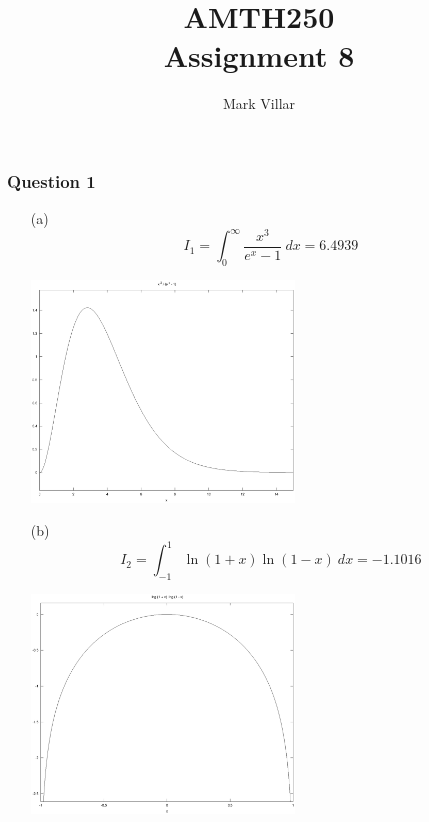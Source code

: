 \documentclass[11pt,a4paper]{article}
\title{AMTH250 \\ Assignment 8}
\author{Mark Villar}
\begin{document}
\maketitle

\subsubsection*{Question 1} 
\begin{enumerate}

	\item[(a)] $$I_1=\int^{\infty}_0 \frac{x^3}{e^x-1} \ dx = 6.4939$$
	\begin{center}
		\includegraphics[width=0.55\textwidth]{f1.eps}
	\end{center}

	\item[(b)] $$I_2=\int^1_{-1} \ln(1+x)\ln(1-x) \ dx = -1.1016$$
	\begin{center}
		\includegraphics[width=0.55\textwidth]{f2.eps}
	\end{center}
	

\end{enumerate}
\end{document}
